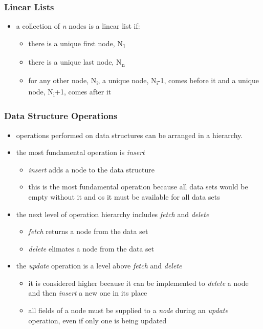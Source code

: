 \documentclass[11pt]{article}
\begin{document}
\subsubsection{Linear Lists}
\label{sec:org0411915}
\begin{itemize}
\item a collection of \emph{n} nodes is a linear list if:
\begin{itemize}
\item there is a unique first node, N\textsubscript{1}
\item there is a unique last node, N\textsubscript{n}
\item for any other node, N\textsubscript{i}, a unique node, N\textsubscript{i}-1, comes before it and a unique node, N\textsubscript{i}+1, comes after it
\end{itemize}
\end{itemize}
\subsubsection{Data Structure Operations}
\label{sec:orgc51e5dd}
\begin{itemize}
\item operations performed on data structures can be arranged in a hierarchy.
\item the most fundamental operation is \emph{insert}
\begin{itemize}
\item \emph{insert} adds a node to the data structure
\item this is the most fundamental operation because all data sets would be empty without it and os it must be available for all data sets
\end{itemize}
\item the next level of operation hierarchy includes \emph{fetch} and \emph{delete}
\begin{itemize}
\item \emph{fetch} returns a node from the data set
\item \emph{delete} elimates a node from the data set
\end{itemize}
\item the \emph{update} operation is a level above \emph{fetch} and \emph{delete}
\begin{itemize}
\item it is considered higher because it can be implemented to \emph{delete} a node and then \emph{insert} a new one in its place
\item all fields of a node must be supplied to a \emph{node} during an \emph{update} operation, even if only one is being updated
\end{itemize}
\end{itemize}
\end{document}
